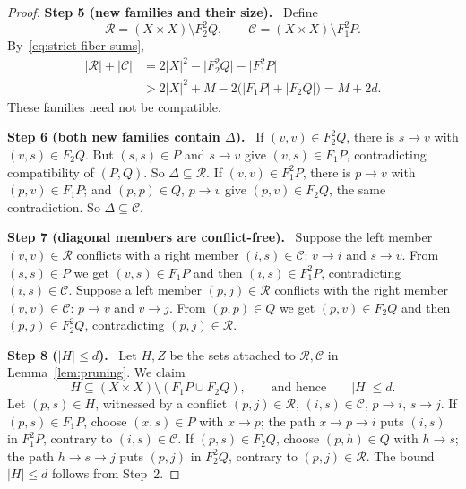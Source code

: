 \documentclass[11pt]{article}
\theoremstyle{remark}
\newcommand{\abs}[1]{\lvert #1\rvert}
\newcommand{\step}[1]{\par\medskip\noindent\textbf{Step #1.}\ }
\begin{document}
\begin{proof}
\step{5 (new families and their size)}
Define
\[
 \mathcal R=(X\times X)\setminus F_2^2Q,
 \qquad
 \mathcal C=(X\times X)\setminus F_1^2P.
\]
By~\eqref{eq:strict-fiber-sums},
\begin{equation}\label{eq:complement-gain}
 \begin{aligned}
 \abs{\mathcal R}+\abs{\mathcal C}
 &=2\abs{X}^2-\abs{F_2^2Q}-\abs{F_1^2P}\\
 &>2\abs{X}^2+M-2\bigl(\abs{F_1P}+\abs{F_2Q}\bigr)
 =M+2d.
 \end{aligned}
\end{equation}
These families need not be compatible.

\step{6 (both new families contain $\Delta$)}
If $(v,v)\in F_2^2Q$, there is $s\to v$ with $(v,s)\in F_2Q$. But
$(s,s)\in P$ and $s\to v$ give $(v,s)\in F_1P$, contradicting compatibility of
$(P,Q)$. So $\Delta\subseteq\mathcal R$. If $(v,v)\in F_1^2P$, there is
$p\to v$ with $(p,v)\in F_1P$; and $(p,p)\in Q$, $p\to v$ give
$(p,v)\in F_2Q$, the same contradiction. So $\Delta\subseteq\mathcal C$.

\step{7 (diagonal members are conflict-free)}
Suppose the left member $(v,v)\in\mathcal R$ conflicts with a right member
$(i,s)\in\mathcal C$: $v\to i$ and $s\to v$. From $(s,s)\in P$ we get
$(v,s)\in F_1P$ and then $(i,s)\in F_1^2P$, contradicting
$(i,s)\in\mathcal C$. Suppose a left member $(p,j)\in\mathcal R$ conflicts
with the right member $(v,v)\in\mathcal C$: $p\to v$ and $v\to j$. From
$(p,p)\in Q$ we get $(p,v)\in F_2Q$ and then $(p,j)\in F_2^2Q$, contradicting
$(p,j)\in\mathcal R$.

\step{8 ($\abs H\le d$)}
Let $H,Z$ be the sets attached to $\mathcal R,\mathcal C$ in
Lemma~\ref{lem:pruning}. We claim
\begin{equation}\label{eq:old-uncovered-bound}
 H\subseteq (X\times X)\setminus(F_1P\cup F_2Q),
 \qquad\text{and hence}\qquad \abs{H}\le d.
\end{equation}
Let $(p,s)\in H$, witnessed by a conflict $(p,j)\in\mathcal R$,
$(i,s)\in\mathcal C$, $p\to i$, $s\to j$. If $(p,s)\in F_1P$, choose
$(x,s)\in P$ with $x\to p$; the path $x\to p\to i$ puts $(i,s)$ in $F_1^2P$,
contrary to $(i,s)\in\mathcal C$. If $(p,s)\in F_2Q$, choose $(p,h)\in Q$ with
$h\to s$; the path $h\to s\to j$ puts $(p,j)$ in $F_2^2Q$, contrary to
$(p,j)\in\mathcal R$. The bound $\abs H\le d$ follows from Step~2.


\end{proof}
\end{document}
